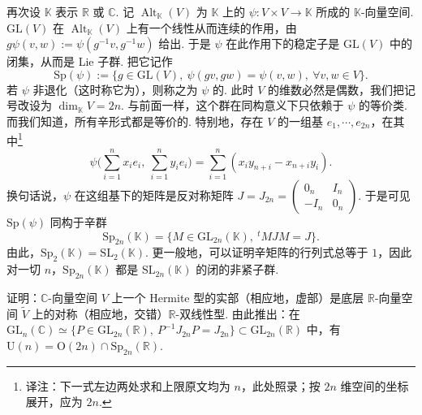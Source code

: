 \begin{numpara}[辛群]\label{np:ssl-1-2-11}
再次设 $\mathbb{K}$ 表示 $\mathbb{R}$ 或 $\mathbb{C}$. 记 $\operatorname{Alt}_{\mathbb{K}}(V)$ 为 $\mathbb{K}$ 上的 $\psi\colon V\times V\longrightarrow\mathbb{K}$ 所成的 $\mathbb{K}$-向量空间. $\mathrm{GL}(V)$ 在 $\operatorname{Alt}_{\mathbb{K}}(V)$ 上有一个线性从而连续的作用，由 $g\psi(v,w):=\psi(g^{-1}v,g^{-1}w)$ 给出. 于是 $\psi$ 在此作用下的稳定子是 $\mathrm{GL}(V)$ 中的闭集，从而是 Lie 子群. 把它记作
\[
\mathrm{Sp}(\psi):=\{g\in\mathrm{GL}(V),\ \psi(gv,gw)=\psi(v,w),\ \forall v,w\in V\}.
\]
若 $\psi$ 非退化（这时称它为），则称之为 $\psi$ 的. 此时 $V$ 的维数必然是偶数，我们把记号改设为 $\dim_{\mathbb{K}}V=2n$. 与前面一样，这个群在同构意义下只依赖于 $\psi$ 的等价类. 而我们知道，所有辛形式都是等价的. 特别地，存在 $V$ 的一组基 $e_1,\cdots,e_{2n}$，在其中\footnote{译注：下一式左边两处求和上限原文均为 $n$，此处照录；按 $2n$ 维空间的坐标展开，应为 $2n$.}
\[
\psi\Big(\sum_{i=1}^{n}x_i e_i,\ \sum_{i=1}^{n}y_i e_i\Big)=\sum_{i=1}^{n}(x_i y_{n+i}-x_{n+i}y_i).
\]
换句话说，$\psi$ 在这组基下的矩阵是反对称矩阵 $J=J_{2n}=\begin{pmatrix}0_n&I_n\\-I_n&0_n\end{pmatrix}$. 于是可见 $\mathrm{Sp}(\psi)$ 同构于辛群
\[
\mathrm{Sp}_{2n}(\mathbb{K})=\{M\in\mathrm{GL}_{2n}(\mathbb{K}),\ {}^{t}MJM=J\}.
\]
由此，$\mathrm{Sp}_{2}(\mathbb{K})=\mathrm{SL}_{2}(\mathbb{K})$. 更一般地，可以证明辛矩阵的行列式总等于 $1$，因此对一切 $n$，$\mathrm{Sp}_{2n}(\mathbb{K})$ 都是 $\mathrm{SL}_{2n}(\mathbb{K})$ 的闭的非紧子群.
\end{numpara}

\begin{exercise*}
证明：$\mathbb{C}$-向量空间 $V$ 上一个 Hermite 型的实部（相应地，虚部）是底层 $\mathbb{R}$-向量空间 $\widetilde{V}$ 上的对称（相应地，交错）$\mathbb{R}$-双线性型. 由此推出：在 $\mathrm{GL}_n(\mathbb{C})\simeq\{P\in\mathrm{GL}_{2n}(\mathbb{R}),\ P^{-1}J_{2n}P=J_{2n}\}\subset\mathrm{GL}_{2n}(\mathbb{R})$ 中，有 $\mathrm{U}(n)=\mathrm{O}(2n)\cap\mathrm{Sp}_{2n}(\mathbb{R})$.
\end{exercise*}

